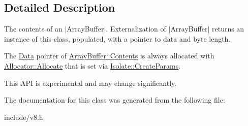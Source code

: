 \subsection{Detailed Description}
The contents of an $\vert$\+Array\+Buffer$\vert$. Externalization of $\vert$\+Array\+Buffer$\vert$ returns an instance of this class, populated, with a pointer to data and byte length.

The \hyperlink{classv8_1_1_data}{Data} pointer of \hyperlink{classv8_1_1_array_buffer_1_1_contents}{Array\+Buffer\+::\+Contents} is always allocated with \hyperlink{classv8_1_1_array_buffer_1_1_allocator_a106b0d80120ed04fe9b9675e96f0340b}{Allocator\+::\+Allocate} that is set via \hyperlink{structv8_1_1_isolate_1_1_create_params}{Isolate\+::\+Create\+Params}.

This A\+PI is experimental and may change significantly. 

The documentation for this class was generated from the following file\+:\begin{DoxyCompactItemize}
\item 
include/v8.\+h\end{DoxyCompactItemize}
